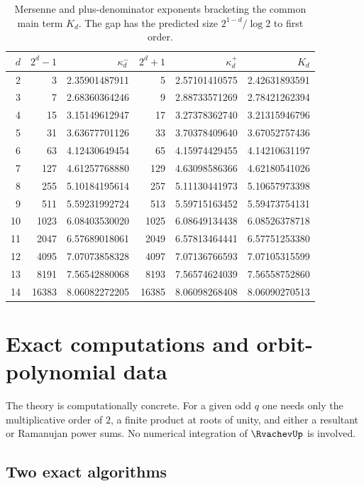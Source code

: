 \documentclass[11pt,oneside]{article}
\theoremstyle{definition}
\theoremstyle{remark}
\begin{document}
\begin{table}[ht]
\centering\small
\begin{tabular}{rrrrrr}
\toprule
$d$ & $2^d-1$ & $\kappa_d^-$ & $2^d+1$ & $\kappa_d^+$ & $K_d$ \\
\midrule
2  & 3     & 2.35901487911 & 5     & 2.57101410575 & 2.42631893591 \\
3  & 7     & 2.68360364246 & 9     & 2.88733571269 & 2.78421262394 \\
4  & 15    & 3.15149612947 & 17    & 3.27378362740 & 3.21315946796 \\
5  & 31    & 3.63677701126 & 33    & 3.70378409640 & 3.67052757436 \\
6  & 63    & 4.12430649454 & 65    & 4.15974429455 & 4.14210631197 \\
7  & 127   & 4.61257768880 & 129   & 4.63098586366 & 4.62180541026 \\
8  & 255   & 5.10184195614 & 257   & 5.11130441973 & 5.10657973398 \\
9  & 511   & 5.59231992724 & 513   & 5.59715163452 & 5.59473754131 \\
10 & 1023  & 6.08403530020 & 1025  & 6.08649134438 & 6.08526378718 \\
11 & 2047  & 6.57689018061 & 2049  & 6.57813464441 & 6.57751253380 \\
12 & 4095  & 7.07073858328 & 4097  & 7.07136766593 & 7.07105315599 \\
13 & 8191  & 7.56542880068 & 8193  & 7.56574624039 & 7.56558752860 \\
14 & 16383 & 8.06082272205 & 16385 & 8.06098268408 & 8.06090270513 \\
\bottomrule
\end{tabular}
\caption{Mersenne and plus-denominator exponents bracketing the common main term
$K_d$. The gap has the predicted size $2^{1-d}/\log2$ to first order.}
\label{p2:tab:pm-kappa}
\end{table}

\section{Exact computations and orbit-polynomial data}\label{p2:sec:computations}

The theory is computationally concrete. For a given odd $q$ one needs only the
multiplicative order of $2$, a finite product at roots of unity, and either a
resultant or Ramanujan power sums. No numerical integration of $\RvachevUp$ is involved.

\subsection{Two exact algorithms}
\end{document}
